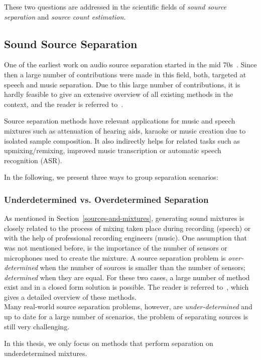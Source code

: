 These two questions are addressed in the scientific fields of \emph{sound source separation} and \emph{source count estimation}.

\subsection{Sound Source Separation}

One of the earliest work on audio source separation started in the mid 70s~\cite{miller73}.
Since then a large number of contributions were made in this field, both, targeted at speech and music separation.
Due to this large number of contributions, it is hardly feasible to give an extensive overview of all existing methods in the context, and the reader is referred to~\cite{vincent18, comon10, rafii}.
\par
Source separation methods have relevant applications for music and speech mixtures such as attenuation of hearing aids, karaoke or music creation due to isolated sample composition.
It also indirectly helps for related tasks such as upmixing/remixing, improved music transcription or automatic speech recognition (ASR). 
\par
In the following, we present three ways to group separation scenarios:

\subsubsection*{Underdetermined vs. Overdetermined Separation}
As mentioned in Section~\ref{sources-and-mixtures}, generating sound mixtures is closely related to the process of mixing taken place during recording (speech) or with the help of professional recording engineers (music).
One assumption that was not mentioned before, is the importance of the number of sensors or microphones used to create the mixture.
A source separation problem is \emph{over-determined} when the number of sources is smaller than the number of sensors; \emph{determined} when they are equal.
For these two cases, a large number of method exist and in a closed form solution is possible.
The reader is referred to~\cite{common10}, which gives a detailed overview of these methods.\\
Many real-world source separation problems, however, are \emph{under-determined} and up to date for a large number of scenarios, the problem of separating sources is still very challenging.
\par
In this thesis, we only focus on methods that perform separation on underdetermined mixtures.

